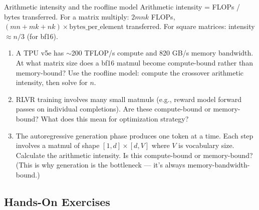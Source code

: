 \begin{thinkfirst}{Arithmetic intensity and the roofline model}
Arithmetic intensity = FLOPs / bytes transferred. For a matrix multiply: $2mnk$ FLOPs, $(mn + mk + nk) \times \text{bytes\_per\_element}$ transferred. For square matrices: intensity $\approx n/3$ (for bf16).

\begin{enumerate}
  \item A TPU v5e has $\sim$200 TFLOP/s compute and 820 GB/s memory bandwidth. At what matrix size does a bf16 matmul become compute-bound rather than memory-bound? Use the roofline model: compute the crossover arithmetic intensity, then solve for $n$.

  \item RLVR training involves many small matmuls (e.g., reward model forward passes on individual completions). Are these compute-bound or memory-bound? What does this mean for optimization strategy?

  \item The autoregressive generation phase produces one token at a time. Each step involves a matmul of shape $[1, d] \times [d, V]$ where $V$ is vocabulary size. Calculate the arithmetic intensity. Is this compute-bound or memory-bound? (This is why generation is the bottleneck --- it's always memory-bandwidth-bound.)
\end{enumerate}
\end{thinkfirst}

\subsection{Hands-On Exercises}

